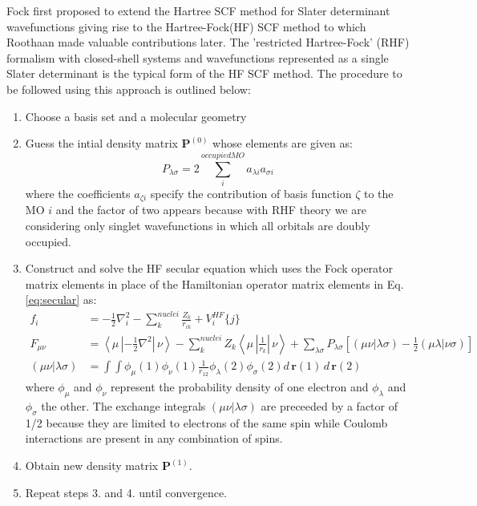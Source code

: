             Fock first proposed to extend the Hartree SCF method for Slater determinant wavefunctions giving rise to the Hartree-Fock(HF) SCF method to which Roothaan made valuable contributions later. The 'restricted Hartree-Fock' (RHF) formalism with closed-shell systems and wavefunctions represented as a single Slater determinant is the typical form of the HF SCF method. The procedure to be followed using this approach is outlined below:
            \begin{enumerate}
                \item Choose a basis set and a molecular geometry
                \item Guess the intial density matrix $\mathbf{P}^{(0)}$ whose elements are given as:
                    \begin{equation}\label{eq:density matrix elements}
                        P_{\lambda \sigma} = 2 \displaystyle\sum_i^{occupied MO} a_{\lambda i} a_{\sigma i}
                    \end{equation}
                    where the coefficients $a_{\zeta i}$ specify the contribution of basis function $\zeta$ to the MO $i$ and the factor of two appears because with RHF theory we are considering only singlet wavefunctions in which all orbitals are doubly occupied.
                \item Construct and solve the HF secular equation which uses the Fock operator matrix elements in place of the Hamiltonian operator matrix elements in Eq. \eqref{eq:secular} as:
                    \begin{equation}\label{eq:one electron Fock matrix elements}
                        \begin{aligned}
                            f_i &= -\frac{1}{2} \nabla^2_i - \displaystyle\sum_k^{nuclei} \frac{Z_k}{r_{ik}} + V_i^{HF} \{j\}\\
                            F_{\mu \nu} &= \left< \mu \,\left| -\frac{1}{2} \nabla^2 \right|\,\nu \right> - \displaystyle\sum_k^{nuclei} Z_k \left< \mu \,\left| \frac{1}{r_k} \right| \, \nu \right> + \displaystyle\sum_{\lambda \sigma} P_{\lambda \sigma} \left[ (\mu \nu | \lambda \sigma) - \frac{1}{2} (\mu \lambda | \nu \sigma) \right]\\
                            (\mu \nu | \lambda \sigma) &= \displaystyle\int \int \phi_\mu (1) \phi_\nu(1) \frac{1}{r_{12}}\phi_\lambda (2) \phi_\sigma (2) d\,\mathbf{r}(1)\,d\,\mathbf{r}(2)
                        \end{aligned}                    
                    \end{equation}
                    where $\phi_\mu$ and $\phi_\nu$ represent the probability density of one electron and $\phi_\lambda$ and $\phi_\sigma$ the other. The exchange integrals $(\mu \nu | \lambda \sigma)$ are preceeded by a factor of 1/2 because they are limited to electrons of the same spin while Coulomb interactions are present in any combination of spins.
                \item Obtain new density matrix $\mathbf{P}^{(1)}$.
                \item Repeat steps 3. and 4. until convergence.
            \end{enumerate}
            
